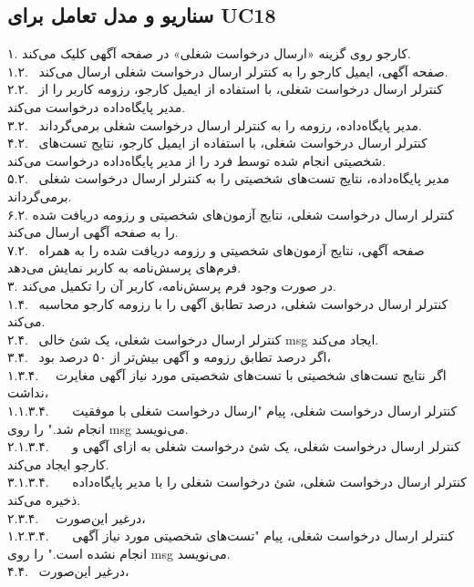 \documentclass[12pt]{article}
\begin{document}
	\subsection{سناریو و مدل تعامل برای UC18}
	۱. کارجو روی گزینه «ارسال درخواست شغلی» در صفحه آگهی کلیک می‌کند.\\
	۱.۲. \ صفحه آگهی، ایمیل کارجو را به کنترلر ارسال درخواست شغلی ارسال می‌کند.\\
	۲.۲. \ کنترلر ارسال درخواست شغلی، با استفاده از ایمیل کارجو، رزومه کاربر را از مدیر پایگاه‌داده درخواست می‌کند.\\
	۳.۲. \ مدیر پایگاه‌داده، رزومه را به کنترلر ارسال درخواست شغلی برمی‌گرداند.\\
	۴.۲. \ کنترلر ارسال درخواست شغلی، با استفاده از ایمیل کارجو، نتایج تست‌های شخصیتی انجام شده توسط فرد را از مدیر پایگاه‌داده درخواست می‌کند.\\
	۵.۲. \ مدیر پایگاه‌داده، نتایج تست‌های شخصیتی را به کنترلر ارسال درخواست شغلی برمی‌گرداند.\\
	۶.۲. کنترلر ارسال درخواست شغلی، نتایج آزمون‌های شخصیتی و رزومه دریافت شده را به صفحه آگهی ارسال می‌کند.\\
	۷.۲. \ صفحه آگهی، نتایج آزمون‌های شخصیتی و رزومه دریافت شده را به همراه فرم‌های پرسش‌نامه به کاربر نمایش می‌دهد.\\
	۳. در صورت وجود فرم پرسش‌نامه، کاربر آن را تکمیل می‌کند.\\
	۱.۴. \ کنترلر ارسال درخواست شغلی، درصد تطابق آگهی را با رزومه کارجو محاسبه می‌کند.\\
	۲.۴. \ کنترلر ارسال درخواست شغلی، یک شئ خالی msg ایجاد می‌کند.\\
	۳.۴. \ اگر درصد تطابق رزومه و آگهی بیش‌تر از ۵۰ درصد بود،\\
	۱.۳.۴. \ \ اگر نتایج تست‌های شخصیتی با تست‌های شخصیتی مورد نیاز آگهی مغایرت نداشت،\\
	۱.۱.۳.۴. \ \ \ کنترلر ارسال درخواست شغلی، پیام "ارسال درخواست شغلی با موفقیت انجام شد." را روی msg می‌نویسد.\\
	۲.۱.۳.۴. \ \ \ کنترلر ارسال درخواست شغلی، یک شئ درخواست شغلی به ازای آگهی و کارجو ایجاد می‌کند.\\
	۳.۱.۳.۴. \ \ \ کنترلر ارسال درخواست شغلی، شئ درخواست شغلی را با مدیر پایگاه‌داده ذخیره می‌کند.\\
	۲.۳.۴. \ \ درغیر این‌صورت،\\
	۱.۲.۳.۴. \ \ \ کنترلر ارسال درخواست شغلی، پیام "تست‌های شخصیتی مورد نیاز آگهی انجام نشده است." را روی msg می‌نویسد.\\
	۴.۴. \ درغیر این‌صورت،\\
\end{document}
